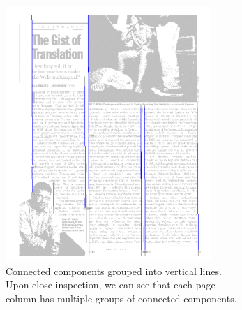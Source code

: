 \begin{figure}[p]
\begin{subfigure}{0.30\textwidth}
\includegraphics[width=\linewidth]{img/tabStopDetection/tessPageSegm2.png}
\caption{Connected components grouped into vertical lines. Upon close inspection, we can see that each page column has multiple groups of connected components.}
\label{fig:segmentationTesseract2}
\end{subfigure}
\quad
\begin{subfigure}{0.30\textwidth}

\end{subfigure}
\end{figure}
